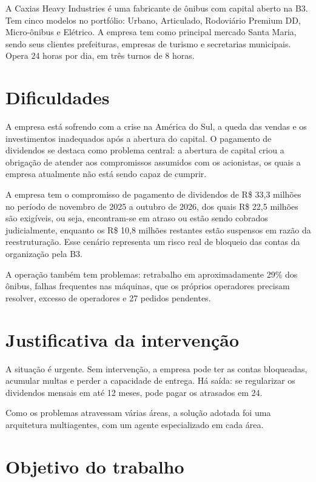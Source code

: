 \documentclass[12pt,a4paper,oneside,brazil]{abntex2}
\begin{document}
A Caxias Heavy Industries é uma fabricante de ônibus com capital aberto na B3. Tem cinco modelos no portfólio: Urbano, Articulado, Rodoviário Premium DD, Micro-ônibus e Elétrico. A empresa tem como principal mercado Santa Maria, sendo seus clientes prefeituras, empresas de turismo e secretarias municipais. Opera 24 horas por dia, em três turnos de 8 horas.

\section{Dificuldades}

A empresa está sofrendo com a crise na América do Sul, a queda das vendas e os investimentos inadequados após a abertura do capital. O pagamento de dividendos se destaca como problema central: a abertura de capital criou a obrigação de atender aos compromissos assumidos com os acionistas, os quais a empresa atualmente não está sendo capaz de cumprir.

A empresa tem o compromisso de pagamento de dividendos de R\$ 33,3 milhões no período de novembro de 2025 a outubro de 2026, dos quais R\$ 22,5 milhões são exigíveis, ou seja, encontram-se em atraso ou estão sendo cobrados judicialmente, enquanto os R\$ 10,8 milhões restantes estão suspensos em razão da reestruturação. Esse cenário representa um risco real de bloqueio das contas da organização pela B3.

A operação também tem problemas: retrabalho em aproximadamente 29\% dos ônibus, falhas frequentes nas máquinas, que os próprios operadores precisam resolver, excesso de operadores e 27 pedidos pendentes.

\section{Justificativa da intervenção}

A situação é urgente. Sem intervenção, a empresa pode ter as contas bloqueadas, acumular multas e perder a capacidade de entrega. Há saída: se regularizar os dividendos mensais em até 12 meses, pode pagar os atrasados em 24.

Como os problemas atravessam várias áreas, a solução adotada foi uma arquitetura multiagentes, com um agente especializado em cada área.

\section{Objetivo do trabalho}
\end{document}

